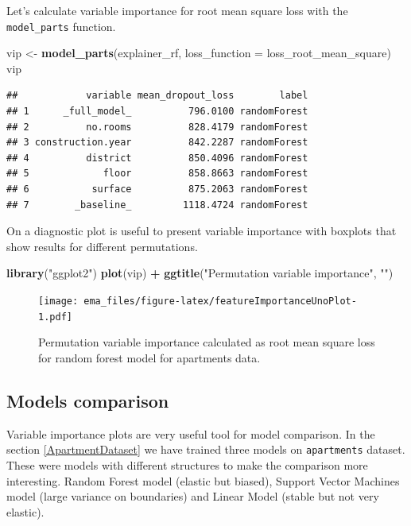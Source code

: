 \documentclass[]{krantz}
\newenvironment{Shaded}{\begin{snugshade}}{\end{snugshade}}
\newcommand{\DataTypeTok}[1]{\textcolor[rgb]{0.13,0.29,0.53}{#1}}
\newcommand{\KeywordTok}[1]{\textcolor[rgb]{0.13,0.29,0.53}{\textbf{#1}}}
\newcommand{\NormalTok}[1]{#1}
\newcommand{\OperatorTok}[1]{\textcolor[rgb]{0.81,0.36,0.00}{\textbf{#1}}}
\newcommand{\StringTok}[1]{\textcolor[rgb]{0.31,0.60,0.02}{#1}}
\begin{document}
Let's calculate variable importance for root mean square loss with the \texttt{model\_parts} function.

\begin{Shaded}
\begin{Highlighting}[]
\NormalTok{vip <-}\StringTok{ }\KeywordTok{model_parts}\NormalTok{(explainer_rf, }
            \DataTypeTok{loss_function =}\NormalTok{ loss_root_mean_square)}
\NormalTok{vip}
\end{Highlighting}
\end{Shaded}

\begin{verbatim}
##            variable mean_dropout_loss        label
## 1      _full_model_          796.0100 randomForest
## 2          no.rooms          828.4179 randomForest
## 3 construction.year          842.2287 randomForest
## 4          district          850.4096 randomForest
## 5             floor          858.8663 randomForest
## 6           surface          875.2063 randomForest
## 7        _baseline_         1118.4724 randomForest
\end{verbatim}

On a diagnostic plot is useful to present variable importance with boxplots that show results for different permutations.

\begin{Shaded}
\begin{Highlighting}[]
\KeywordTok{library}\NormalTok{(}\StringTok{"ggplot2"}\NormalTok{)}
\KeywordTok{plot}\NormalTok{(vip) }\OperatorTok{+}
\StringTok{  }\KeywordTok{ggtitle}\NormalTok{(}\StringTok{"Permutation variable importance"}\NormalTok{, }\StringTok{""}\NormalTok{)}
\end{Highlighting}
\end{Shaded}

\begin{figure}
\centering
\texttt{[image: ema\_files/figure-latex/featureImportanceUnoPlot-1.pdf]}
\caption{\label{fig:featureImportanceUnoPlot}Permutation variable importance calculated as root mean square loss for random forest model for apartments data.}
\end{figure}

\hypertarget{models-comparison}{%
\subsection{Models comparison}\label{models-comparison}}

Variable importance plots are very useful tool for model comparison. In the section \ref{ApartmentDataset} we have trained three models on \texttt{apartments} dataset.
These were models with different structures to make the comparison more interesting.
Random Forest model \citep{R-randomForest} (elastic but biased), Support Vector Machines model \citep{R-e1071} (large variance on boundaries) and Linear Model (stable but not very elastic).
\end{document}
